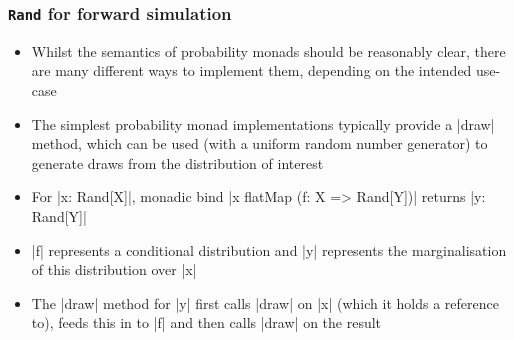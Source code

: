 \documentclass[mathserif,handout]{beamer}
\begin{document}
\begin{frame}[fragile]
  \frametitle{\texttt{Rand} for forward simulation}
  \begin{itemize}
    \item Whilst the semantics of probability monads should be reasonably clear, there are many different ways to implement them, depending on the intended use-case
  \item The simplest probability monad implementations typically provide a |draw| method, which can be used (with a uniform random number generator) to generate draws from the distribution of interest
  \item For |x: Rand[X]|, monadic bind |x flatMap (f: X => Rand[Y])| returns |y: Rand[Y]|
    \item |f| represents a conditional distribution and |y| represents the marginalisation of this distribution over |x|
    \item The |draw| method for |y| first calls |draw| on |x| (which it holds a reference to), feeds this in to |f| and then calls |draw| on the result
    \end{itemize}
\end{frame}

\end{document}
